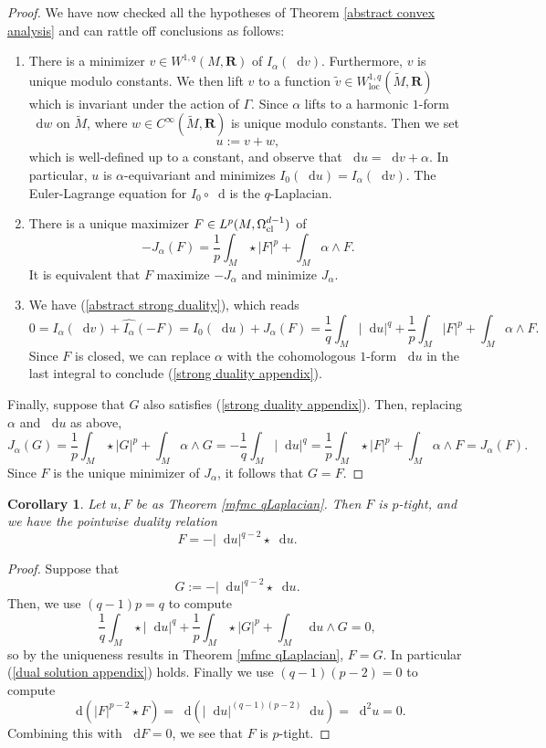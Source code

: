 \documentclass[reqno,11pt]{amsart}
\newcommand{\RR}{\mathbf{R}}
\newcommand*\dif{\mathop{}\!\mathrm{d}}
\newcommand{\loc}{\mathrm{loc}}
\newtheorem{corollary}[theorem]{Corollary}
\theoremstyle{definition}
\numberwithin{equation}{section}
\begin{document}
\begin{proof}
We have now checked all the hypotheses of Theorem \ref{abstract convex analysis} and can rattle off conclusions as follows:
\begin{enumerate}
\item There is a minimizer $v \in W^{1, q}(M, \RR)$ of $I_\alpha(\dif v)$. Furthermore, $v$ is unique modulo constants.
We then lift $v$ to a function $\tilde v \in W^{1, q}_\loc(\tilde M, \RR)$ which is invariant under the action of $\Gamma$.
Since $\alpha$ lifts to a harmonic $1$-form $\dif w$ on $\tilde M$, where $w \in C^\infty(\tilde M, \RR)$ is unique modulo constants.
Then we set 
$$u := v + w,$$
which is well-defined up to a constant, and observe that $\dif u = \dif v + \alpha$.
In particular, $u$ is $\alpha$-equivariant and minimizes $I_0(\dif u) = I_\alpha(\dif v)$.
The Euler-Lagrange equation for $I_0 \circ \dif$ is the $q$-Laplacian.
\item There is a unique maximizer $F \in L^p(M, \Omega^{d - 1}_{\rm cl})$ of
$$-J_\alpha(F) = \frac{1}{p} \int_M \star |F|^p + \int_M \alpha \wedge F.$$
It is equivalent that $F$ maximize $-J_\alpha$ and minimize $J_\alpha$.
\item We have (\ref{abstract strong duality}), which reads 
$$0 = I_\alpha(\dif v) + \widehat{I_\alpha}(-F) = I_0(\dif u) + J_\alpha(F) = \frac{1}{q} \int_M |\dif u|^q + \frac{1}{p} \int_M |F|^p + \int_M \alpha \wedge F.$$
Since $F$ is closed, we can replace $\alpha$ with the cohomologous $1$-form $\dif u$ in the last integral to conclude (\ref{strong duality appendix}).
\end{enumerate}

Finally, suppose that $G$ also satisfies (\ref{strong duality appendix}).
Then, replacing $\alpha$ and $\dif u$ as above,
$$J_\alpha(G) = \frac{1}{p} \int_M \star |G|^p + \int_M \alpha \wedge G = -\frac{1}{q} \int_M |\dif u|^q = \frac{1}{p} \int_M \star |F|^p + \int_M \alpha \wedge F = J_\alpha(F).$$
Since $F$ is the unique minimizer of $J_\alpha$, it follows that $G = F$.
\end{proof}

\begin{corollary}
Let $u, F$ be as Theorem \ref{mfmc qLaplacian}.
Then $F$ is $p$-tight, and we have the pointwise duality relation
\begin{equation}\label{dual solution appendix}
F = -|\dif u|^{q - 2} \star \dif u.
\end{equation}
\end{corollary}
\begin{proof}
Suppose that
$$G := -|\dif u|^{q - 2} \star \dif u.$$
Then, we use $(q - 1)p = q$ to compute
$$\frac{1}{q} \int_M \star |\dif u|^q + \frac{1}{p} \int_M \star |G|^p + \int_M \dif u \wedge G = 0,$$
so by the uniqueness results in Theorem \ref{mfmc qLaplacian}, $F = G$.
In particular (\ref{dual solution appendix}) holds.
Finally we use $(q - 1)(p - 2) = 0$ to compute 
$$\dif(|F|^{p - 2} \star F) = \dif(|\dif u|^{(q - 1)(p - 2)} \dif u) = \dif^2 u = 0.$$
Combining this with $\dif F = 0$, we see that $F$ is $p$-tight.
\end{proof}
\end{document}

